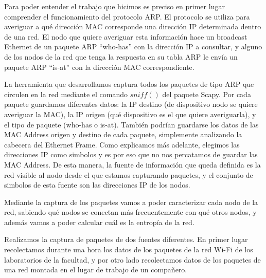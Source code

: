 Para poder entender el trabajo que hicimos es preciso en primer lugar comprender
el funcionamiento del protocolo ARP. El protocolo se utiliza para averiguar a
qué dirección MAC corresponde una dirección IP determinada dentro de una red. El
nodo que quiere averiguar esta información hace un broadcast Ethernet de un
paquete ARP ``who-has'' con la dirección IP a consultar, y alguno de los nodos
de la red que tenga la respuesta en su tabla ARP le envía un paquete ARP
``is-at'' con la dirección MAC correspondiente.

La herramienta que desarrollamos captura todos los paquetes de tipo ARP que
circulen en la red mediante el comando $sniff()$ del paquete Scapy. Por cada
paquete guardamos diferentes datos: la IP destino (de dispositivo nodo se quiere
averiguar la MAC), la IP origen (qué dispositivo es el que quiere averiguarla),
y el tipo de paquete (who-has o is-at). También podrían guardarse los datos de las MAC Address origen y destino de cada paquete, simplemente analizando la cabecera del Ethernet Frame. Como explicamos más adelante, elegimos las direcciones IP como simbolos y es por eso que no nos percatamos de guardar las MAC Address. De esta manera, la fuente de información
que queda definida es la red visible al nodo desde el que estamos capturando
paquetes, y el conjunto de simbolos de esta fuente son las direcciones IP de los
nodos.

Mediante la captura de los paquetes vamos a poder caracterizar cada nodo de la
red, sabiendo qué nodos se conectan más frecuentemente con qué otros nodos, y
además vamos a poder calcular cuál es la entropía de la red.

Realizamos la captura de paquetes de dos fuentes diferentes. En primer lugar
recolectamos durante una hora los datos de los paquetes de la red Wi-Fi de los
laboratorios de la facultad, y por otro lado recolectamos datos de los paquetes
de una red montada en el lugar de trabajo de un compañero.